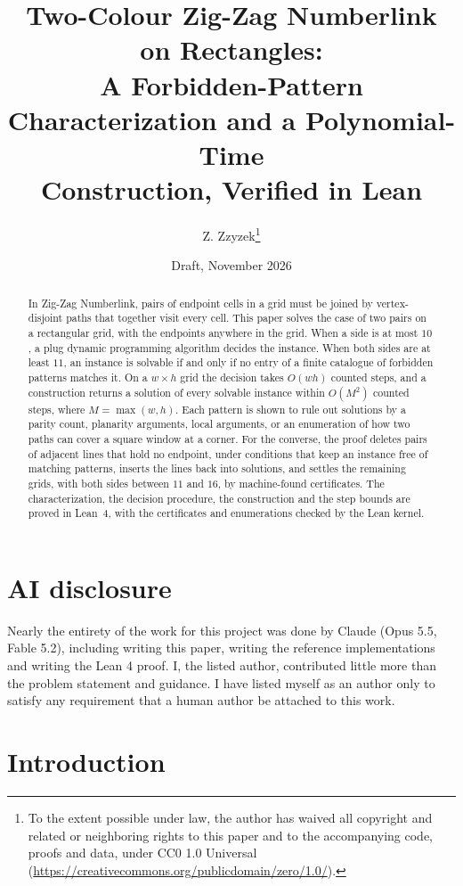 \documentclass[11pt]{article}
\title{Two-Colour Zig-Zag Numberlink on Rectangles:\\
A Forbidden-Pattern Characterization and a Polynomial-Time\\
Construction, Verified in Lean}
\author{Z. Zzyzek\thanks{To the extent possible under law, the author has waived all copyright and
related or neighboring rights to this paper and to the accompanying code, proofs and data, under
CC0 1.0 Universal (\url{https://creativecommons.org/publicdomain/zero/1.0/}).}}
\date{Draft, November 2026}
\makeatletter
\newcommand{\secmark}[1]{\pdfsavepos\protected@write\@auxout{}{\string\secpos{#1}{\thepage}{\noexpand\the\noexpand\pdflastypos}}}
\def\secpos#1#2#3{}
\makeatother
\begin{document}
\maketitle

\begin{abstract}
In Zig-Zag Numberlink, pairs of endpoint cells in a grid must be joined by vertex-disjoint paths
that together visit every cell. This paper solves the case of two pairs on a rectangular grid, with
the endpoints anywhere in the grid. When a side is at most $10$, a plug dynamic programming
algorithm decides the instance. When both sides are at least $11$, an instance is solvable if and
only if no entry of a finite catalogue of forbidden patterns matches it. On a $w\times h$ grid
the decision takes $O(wh)$ counted steps, and a construction returns a solution of every solvable
instance within $O(M^2)$ counted steps, where $M=\max(w,h)$. Each pattern is shown to
rule out solutions by a parity count, planarity arguments, local arguments, or an enumeration of
how two paths can cover a square window at a corner. For the converse, the proof deletes pairs of
adjacent lines that hold no endpoint, under conditions that keep an instance free of matching
patterns, inserts the lines back into solutions, and settles the remaining grids,
with both sides between $11$ and $16$, by machine-found certificates. The characterization, the
decision procedure, the construction and the step bounds are proved in Lean~4, with the
certificates and enumerations checked by the Lean kernel.
\end{abstract}

\section*{AI disclosure}
Nearly the entirety of the work for this project was done by Claude (Opus 5.5, Fable 5.2), including writing
this paper, writing the reference implementations and writing the Lean 4 proof. I, the listed
author, contributed little more than the problem statement and guidance. I have listed myself as
an author only to satisfy any requirement that a human author be attached to this work.

\secmark{intro}
\section{Introduction}\label{sec:intro}
\end{document}
